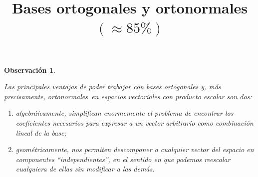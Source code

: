 \documentclass[12pt,dvipsnames]{article}
\newtheorem{obs}{Observación}[section]
\numberwithin{equation}{section}
\begin{document}
\title{Bases ortogonales y ortonormales \\
$(\approx 85\%)$}
\date{}
\maketitle

\begin{obs}\label{obs:1}

Las principales ventajas de poder trabajar con bases ortogonales \textemdash y, más precisamente, ortonormales\textemdash \ en espacios vectoriales con producto escalar son dos:

\begin{enumerate}
    \item algebráicamente,  simplifican enormemente el problema de encontrar los coeficientes necesarios para expresar a un vector arbitrario como combinación lineal de la base;
    
    \item geométricamente, nos permiten descomponer a cualquier vector del espacio en componentes ``independientes'', en el sentido en que podemos reescalar cualquiera de ellas sin modificar a las demás.
\end{enumerate}
\end{obs}
\end{document}
